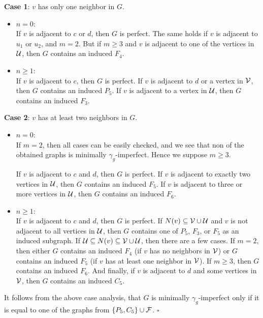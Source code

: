 \documentclass[12pt]{article}
\newcommand{\qed}{\hfill $\square$ \bigskip}
\newcommand{\cF}{{\cal F}}
\newcommand{\cU}{{\cal U}}
\newcommand{\cV}{{\cal V}}
\begin{document}
\medskip\noindent
\textbf{Case 1}: $v$ has only one neighbor in $G$.
	\begin{itemize}
		\item $n = 0$:\\
		If $v$ is adjacent to $c$ or $d$, then $G$ is perfect. The same holds if $v$ is adjacent to $u_1$ or $u_2$, and $m = 2$. But if $m \geq 3$ and $v$ is adjacent to one of the vertices in $\cU$, then $G$ contains an induced $F_4$. 
		
		\item $n \geq 1$:\\
		If $v$ is adjacent to $c$, then $G$ is perfect. If $v$ is adjacent to $d$ or a vertex in $\cV$, then $G$ contains an induced $P_5$. If $v$ is adjacent to a vertex in $\cU$, then $G$ contains an induced $F_3$. 
	\end{itemize}
\medskip\noindent
\textbf{Case 2}: $v$ has at least two neighbors in $G$.
	\begin{itemize}
		\item $n = 0$:\\
		If $m = 2$, then all cases can be easily checked, and we see that non of the obtained graphs is minimally $\gamma_g$-imperfect. Hence we suppose $m \geq 3$. 
		
		If $v$ is adjacent to $c$ and $d$, then $G$ is perfect. If $v$ is adjacent to exactly two vertices in $\cU$, then $G$ contains an induced $F_5$. If $v$ is adjacent to three or more vertices in $\cU$, then $G$ contains an induced $F_6$. 
		
		\item $n \geq 1$:\\
		If $v$ is adjacent to $c$ and $d$, then $G$ is perfect. If $N(v) \subseteq \cV \cup \cU$ and $v$ is not adjacent to all vertices in $\cU$, then $G$ contains one of $P_5$, $F_3$, or $F_5$ as an induced subgraph. If $\cU \subseteq N(v) \subseteq \cV \cup \cU$, then there are a few cases. If $m = 2$, then either $G$ contains an induced $F_4$ (if $v$ has no neighbors in $\cV$) or $G$ contains an induced $F_5$ (if $v$ has at least one neighbor in $\cV$). If $m \geq 3$, then $G$ contains an induced $F_6$. And finally, if $v$ is adjacent to $d$ and some vertices in $\cV$, then $G$ contains an induced $C_5$. 
	\end{itemize}

It follows from the above case analysis, that $G$ is minimally $\gamma_g$-imperfect only if it is equal to one of the graphs from $\{P_5, C_5\} \cup \cF$.
\qed


\end{document}
